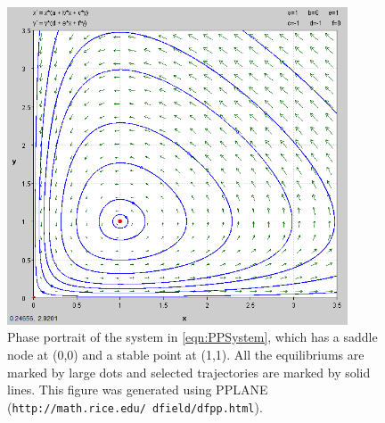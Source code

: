 \documentclass[a4paper,twocolumn]{article} %
\begin{document}
\begin{figure}[p] %
  \begin{center}
    \includegraphics[width = 0.9\textwidth, height = 0.5\textwidth]{p3}
  \end{center}
  \caption{Phase portrait of the system in \eqref{eqn:PPSystem}, which has a saddle node at \mbox{(0,0)} and a stable point at \mbox{(1,1)}. All the equilibriums are marked by large dots and selected trajectories are marked by solid lines. This figure was generated using PPLANE (\texttt{http://math.rice.edu/~dfield/dfpp.html}).}
  \label{fig:pplane2}
\end{figure}
\end{document}
